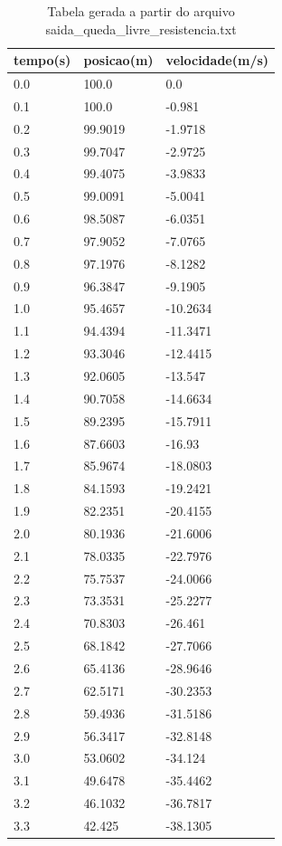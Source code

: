 \begin{table}
\caption{Tabela gerada a partir do arquivo saida\_queda\_livre\_resistencia.txt}
\label{tab:saida_queda_livre_resistencia}
\begin{tabular}{lll}
\toprule
tempo(s) & posicao(m) & velocidade(m/s) \\
\midrule
0.0 & 100.0 & 0.0 \\
0.1 & 100.0 & -0.981 \\
0.2 & 99.9019 & -1.9718 \\
0.3 & 99.7047 & -2.9725 \\
0.4 & 99.4075 & -3.9833 \\
0.5 & 99.0091 & -5.0041 \\
0.6 & 98.5087 & -6.0351 \\
0.7 & 97.9052 & -7.0765 \\
0.8 & 97.1976 & -8.1282 \\
0.9 & 96.3847 & -9.1905 \\
1.0 & 95.4657 & -10.2634 \\
1.1 & 94.4394 & -11.3471 \\
1.2 & 93.3046 & -12.4415 \\
1.3 & 92.0605 & -13.547 \\
1.4 & 90.7058 & -14.6634 \\
1.5 & 89.2395 & -15.7911 \\
1.6 & 87.6603 & -16.93 \\
1.7 & 85.9674 & -18.0803 \\
1.8 & 84.1593 & -19.2421 \\
1.9 & 82.2351 & -20.4155 \\
2.0 & 80.1936 & -21.6006 \\
2.1 & 78.0335 & -22.7976 \\
2.2 & 75.7537 & -24.0066 \\
2.3 & 73.3531 & -25.2277 \\
2.4 & 70.8303 & -26.461 \\
2.5 & 68.1842 & -27.7066 \\
2.6 & 65.4136 & -28.9646 \\
2.7 & 62.5171 & -30.2353 \\
2.8 & 59.4936 & -31.5186 \\
2.9 & 56.3417 & -32.8148 \\
3.0 & 53.0602 & -34.124 \\
3.1 & 49.6478 & -35.4462 \\
3.2 & 46.1032 & -36.7817 \\
3.3 & 42.425 & -38.1305 \\

\end{tabular}
\end{table}
